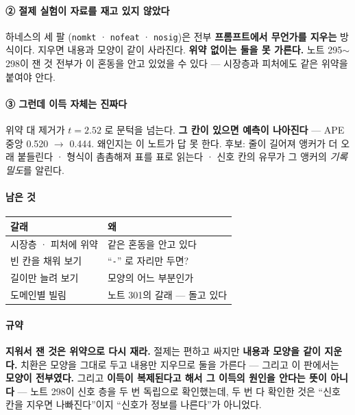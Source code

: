 \documentclass[10pt]{article}
\begin{document}
\paragraph{② 절제 실험이 자료를 재고 있지 않았다} 하네스의 세 팔
(\texttt{nomkt} · \texttt{nofeat} · \texttt{nosig})은 전부 \textbf{프롬프트에서
무언가를 지우는} 방식이다. 지우면 내용과 모양이 같이 사라진다. \textbf{위약
없이는 둘을 못 가른다.} 노트 295$\sim$298이 잰 것 전부가 이 혼동을 안고
있었을 수 있다 --- 시장층과 피처에도 같은 위약을 붙여야 안다.

\paragraph{③ 그런데 이득 자체는 진짜다} 위약 대 제거가 $t{=}2.52$ 로 문턱을
넘는다. \textbf{그 칸이 있으면 예측이 나아진다} --- APE 중앙 0.520 $\to$
0.444. 왜인지는 이 노트가 답 못 한다. 후보: 줄이 길어져 앵커가 더 오래
붙들린다 · 형식이 촘촘해져 표를 표로 읽는다 · 신호 칸의 유무가 그 앵커의
\emph{기록 밀도}를 알린다.

\paragraph{남은 것}
\begin{center}\small
\begin{tabular}{ll}
\hline
갈래 & 왜 \\
\hline
시장층 · 피처에 위약 & 같은 혼동을 안고 있다 \\
빈 칸을 채워 보기 & ``\texttt{-}'' 로 자리만 두면? \\
길이만 늘려 보기 & 모양의 어느 부분인가 \\
도메인별 빌림 & 노트 301의 갈래 --- 돌고 있다 \\
\hline
\end{tabular}
\end{center}

\paragraph{규약} \textbf{지워서 잰 것은 위약으로 다시 재라.} 절제는 편하고
싸지만 \textbf{내용과 모양을 같이 지운다.} 치환은 모양을 그대로 두고 내용만
지우므로 둘을 가른다 --- 그리고 이 판에서는 \textbf{모양이 전부였다.}
그리고 \textbf{이득이 복제된다고 해서 그 이득의 원인을 안다는 뜻이 아니다}
--- 노트 298이 신호 층을 두 번 독립으로 확인했는데, 두 번 다 확인한 것은
``신호 칸을 지우면 나빠진다''이지 ``신호가 정보를 나른다''가 아니었다.
\end{document}
